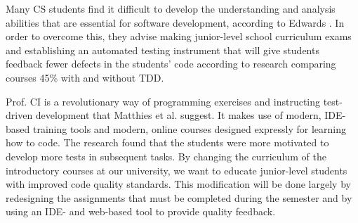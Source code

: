 Many CS students find it difficult to develop the understanding and analysis abilities that are essential for software development, according to Edwards \cite{ref40}. In order to overcome this, they advise making junior-level school curriculum exams and establishing an automated testing instrument that will give students feedback fewer defects in the students’ code according to research \cite{ref41} comparing courses 45\% with and without TDD.\par 
Prof. CI is a revolutionary way of programming exercises and instructing test-driven development that Matthies et al. \cite{ref42} suggest. It makes use of modern, IDE-based training tools and modern, online courses designed expressly for learning how to code. The research found that the students were more motivated to develop more tests in subsequent tasks. By changing the curriculum of the introductory courses at our university, we want to educate junior-level students with improved code quality standards. This modification will be done largely by redesigning the assignments that must be completed during the semester and by using an IDE- and web-based tool to provide quality feedback.
